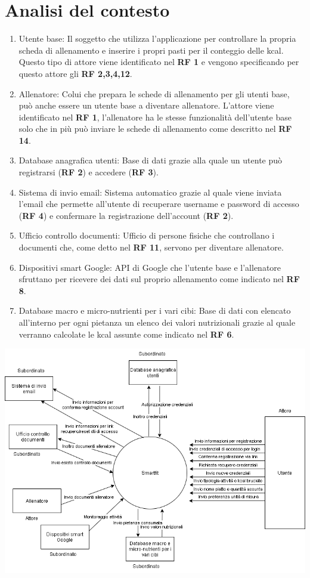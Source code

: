 \documentclass{article}
\begin{document}
      \section{Analisi del contesto}
      \begin{enumerate}
      \item Utente base: Il soggetto che utilizza l’applicazione per controllare la propria scheda di allenamento e inserire i propri pasti per il
            conteggio delle kcal. Questo tipo di attore viene identificato nel \textbf{RF 1} e vengono specificando per questo attore gli
            \textbf{RF 2,3,4,12}.
      \item Allenatore: Colui che prepara le schede di allenamento per gli utenti base, può anche essere un utente base a diventare allenatore.
            L’attore viene identificato nel \textbf{RF 1}, l’allenatore ha le stesse funzionalità dell’utente base solo che in più può inviare le
            schede di allenamento come descritto nel \textbf{RF 14}.
      \item Database anagrafica utenti: Base di dati grazie alla quale un utente può registrarsi (\textbf{RF 2}) e accedere (\textbf{RF 3}).
      \item Sistema di invio email: Sistema automatico grazie al quale viene inviata l’email che permette all’utente di recuperare username e password
            di accesso (\textbf{RF 4}) e confermare la registrazione dell’account (\textbf{RF 2}).
      \item Ufficio controllo documenti: Ufficio di persone fisiche che controllano i documenti che, come detto nel \textbf{RF 11}, servono per
            diventare allenatore.
      \item Dispositivi smart Google: API di Google che l’utente base e l’allenatore sfruttano per ricevere dei dati sul proprio allenamento come
            indicato nel \textbf{RF 8}.
      \item Database macro e micro-nutrienti per i vari cibi: Base di dati con elencato all’interno per ogni pietanza un elenco dei valori nutrizionali
            grazie al quale verranno calcolate le kcal assunte come indicato nel \textbf{RF 6}.
      \end{enumerate}
      \includegraphics[width=175mm]{Diagramma di contesto.png}
\end{document}
